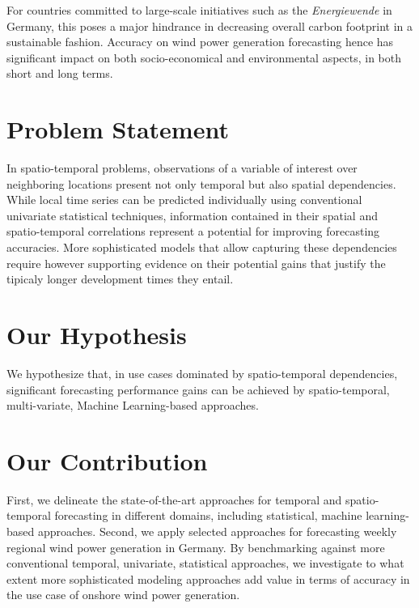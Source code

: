 For countries committed to large-scale initiatives such as the \textit{Energiewende} in Germany, this poses a major hindrance in decreasing overall carbon footprint in a sustainable fashion.
Accuracy on wind power generation forecasting hence has significant impact on both socio-economical and environmental aspects, in both short and long terms.

\section{Problem Statement}
In spatio-temporal problems, observations of a variable of interest over neighboring locations present not only temporal but also spatial dependencies.
While local time series can be predicted individually using conventional univariate statistical techniques, information contained in their spatial and spatio-temporal correlations represent a potential for improving forecasting accuracies. More sophisticated models that allow capturing these dependencies require however supporting evidence on their potential gains that justify the tipicaly longer development times they entail.

\section{Our Hypothesis}
We hypothesize that, in use cases dominated by spatio-temporal dependencies, significant forecasting performance gains can be achieved by spatio-temporal, multi-variate, Machine Learning-based approaches.

\section{Our Contribution}
First, we delineate the state-of-the-art approaches for temporal and spatio-temporal forecasting in different domains, including statistical, machine learning-based approaches.
Second, we apply selected approaches for forecasting weekly regional wind power generation in Germany.
By benchmarking against more conventional temporal, univariate, statistical approaches, we investigate to what extent more sophisticated modeling approaches add value in terms of accuracy in the use case of onshore wind power generation.